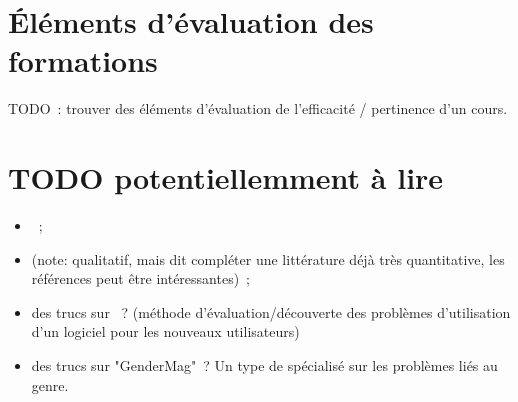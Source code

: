 \section{Éléments d'évaluation des formations}

TODO : trouver des éléments d'évaluation de l'efficacité / pertinence d'un cours.

\section{TODO potentiellemment à lire}

\begin{itemize}
    \item {} ;
    \item {} (note: qualitatif, mais dit compléter une littérature déjà très
        quantitative, les références peut être intéressantes) ;
    \item des trucs sur  ? (méthode  d'évaluation/découverte des
        problèmes d'utilisation d'un logiciel pour les nouveaux utilisateurs)
    \item des trucs sur "GenderMag" ? Un type de  spécialisé sur les problèmes liés
        au genre. 
\end{itemize}
